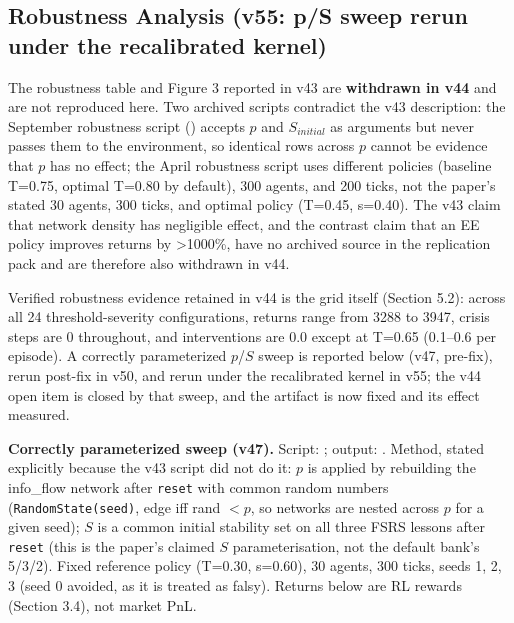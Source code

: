 \documentclass[11pt]{article}
\begin{document}
\subsection{Robustness Analysis (v55: p/S sweep rerun under the recalibrated kernel)}
The robustness table and Figure 3 reported in v43 are \textbf{withdrawn in v44} and are not reproduced here. Two archived scripts contradict the v43 description: the September robustness script () accepts $p$ and $S_{initial}$ as arguments but never passes them to the environment, so identical rows across $p$ cannot be evidence that $p$ has no effect; the April robustness script uses different policies (baseline T=0.75, optimal T=0.80 by default), 300 agents, and 200 ticks, not the paper's stated 30 agents, 300 ticks, and optimal policy (T=0.45, s=0.40). The v43 claim that network density has negligible effect, and the contrast claim that an EE policy improves returns by >1000\%, have no archived source in the replication pack and are therefore also withdrawn in v44.

Verified robustness evidence retained in v44 is the grid itself (Section 5.2): across all 24 threshold-severity configurations, returns range from 3288 to 3947, crisis steps are 0 throughout, and interventions are 0.0 except at T=0.65 (0.1--0.6 per episode). A correctly parameterized $p$/$S$ sweep is reported below (v47, pre-fix), rerun post-fix in v50, and rerun under the recalibrated kernel in v55; the v44 open item is closed by that sweep, and the artifact is now fixed and its effect measured.

\textbf{Correctly parameterized sweep (v47).} Script: ; output: . Method, stated explicitly because the v43 script did not do it: $p$ is applied by rebuilding the info\_flow network after \texttt{reset} with common random numbers (\texttt{RandomState(seed)}, edge iff rand $< p$, so networks are nested across $p$ for a given seed); $S$ is a common initial stability set on all three FSRS lessons after \texttt{reset} (this is the paper's claimed $S$ parameterisation, not the default bank's 5/3/2). Fixed reference policy (T=0.30, s=0.60), 30 agents, 300 ticks, seeds 1, 2, 3 (seed 0 avoided, as it is treated as falsy). Returns below are RL rewards (Section 3.4), not market PnL.
\end{document}
